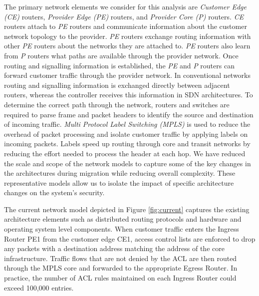 The primary network elements we consider for this analysis are \textit{Customer Edge (CE)} routers, \textit{Provider Edge (PE)} routers, and \textit{Provider Core (P)} routers. \textit{CE} routers attach to \textit{PE} routers and communicate information about the customer network  topology to the provider. \textit{PE} routers exchange routing information with other \textit{PE} routers about the networks they are attached to. \textit{PE} routers also learn from \textit{P} routers what paths are available through the provider network.  Once routing and signalling information is established, the \textit{PE} and \textit{P} routers can forward customer traffic through the provider network. In conventional networks routing and signalling information is exchanged directly between adjacent routers, whereas the controller receives this information in SDN architectures. To determine the correct path through the network, routers and switches are required to parse frame and packet headers to identify the source and destination of incoming traffic. \textit{Multi Protocol Label Switching (MPLS)}\cite{Awduche_Agogbua_1999} is used to reduce the overhead of packet processing and isolate customer traffic by applying labels on incoming packets. Labels speed up routing through core and transit networks by reducing the effort needed to process the header at each hop. We have reduced the scale and scope of the network models to capture some of the key changes in the architectures during migration while reducing overall complexity. These representative models allow us to isolate the impact of specific architecture changes on the system’s security.  %

The current network model depicted in Figure \ref{fig:current} captures the existing architecture elements such as distributed routing protocols and hardware and operating system level components. When customer traffic enters the Ingress Router PE1 from the customer edge CE1, access control lists are enforced to drop any packets with a destination address matching the address of the core infrastructure. Traffic flows that are not denied by the ACL are then routed through the MPLS core and forwarded to the appropriate Egress Router. In practice, the number of ACL rules maintained on each Ingress Router could exceed 100,000 entries.  

